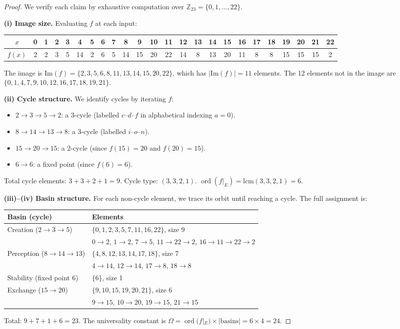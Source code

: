 \documentclass[11pt,a4paper]{article}
\theoremstyle{plain}
\theoremstyle{remark}
\newcommand{\Z}{\mathbb{Z}}
\DeclareMathOperator{\ord}{ord}
\begin{document}
\begin{proof}
We verify each claim by exhaustive computation over $\Z_{23}=\{0,1,\ldots,22\}$.

\textbf{(i) Image size.}  Evaluating $f$ at each input:
\begin{center}\small
\begin{tabular}{@{}c|ccccccccccccccccccccccc@{}}
$x$ & 0&1&2&3&4&5&6&7&8&9&10&11&12&13&14&15&16&17&18&19&20&21&22\\
\hline
$f(x)$ & 2&2&3&5&14&2&6&5&14&15&20&22&14&8&13&20&11&8&8&15&15&15&2
\end{tabular}
\end{center}
The image is $\mathrm{Im}(f)=\{2,3,5,6,8,11,13,14,15,20,22\}$, which has
$|\mathrm{Im}(f)|=11$ elements.  The 12 elements not in the image are
$\{0,1,4,7,9,10,12,16,17,18,19,21\}$.

\textbf{(ii) Cycle structure.}  We identify cycles by iterating $f$:
\begin{itemize}[nosep]
  \item $2\to 3\to 5\to 2$: a 3-cycle (labelled $c$--$d$--$f$ in
        alphabetical indexing $a{=}0$).
  \item $8\to 14\to 13\to 8$: a 3-cycle (labelled $i$--$o$--$n$).
  \item $15\to 20\to 15$: a 2-cycle (since $f(15)=20$ and $f(20)=15$).
  \item $6\to 6$: a fixed point (since $f(6)=6$).
\end{itemize}
Total cycle elements: $3+3+2+1=9$.  Cycle type: $(3,3,2,1)$.
$\ord(f|_E)=\mathrm{lcm}(3,3,2,1)=6$.

\textbf{(iii)--(iv) Basin structure.}  For each non-cycle element,
we trace its orbit until reaching a cycle.  The full assignment is:
\begin{center}\small
\begin{tabular}{@{}ll@{}}
\toprule
\textbf{Basin (cycle)} & \textbf{Elements} \\
\midrule
Creation ($2\to 3\to 5$)
  & $\{0,1,2,3,5,7,11,16,22\}$, size 9 \\
  & \quad $0\!\to\!2$,\; $1\!\to\!2$,\; $7\!\to\!5$,\;
    $11\!\to\!22\!\to\!2$,\; $16\!\to\!11\!\to\!22\!\to\!2$ \\[2pt]
Perception ($8\to 14\to 13$)
  & $\{4,8,12,13,14,17,18\}$, size 7 \\
  & \quad $4\!\to\!14$,\; $12\!\to\!14$,\;
    $17\!\to\!8$,\; $18\!\to\!8$ \\[2pt]
Stability (fixed point $6$)
  & $\{6\}$, size 1 \\[2pt]
Exchange ($15\to 20$)
  & $\{9,10,15,19,20,21\}$, size 6 \\
  & \quad $9\!\to\!15$,\; $10\!\to\!20$,\;
    $19\!\to\!15$,\; $21\!\to\!15$ \\
\bottomrule
\end{tabular}
\end{center}
Total: $9+7+1+6=23$. The universality constant is
$\Omega=\ord(f|_E)\times|\text{basins}|=6\times 4=24$.
\end{proof}
\end{document}
